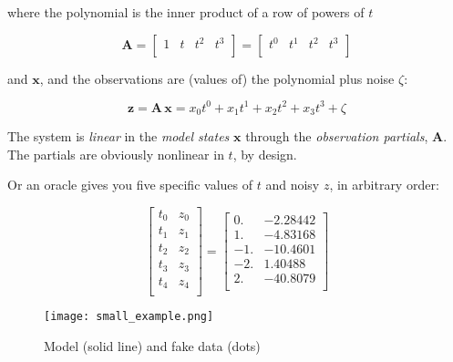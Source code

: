 \documentclass[10pt,oneside,x11names]{article}
\begin{document}
\noindent where the polynomial is the inner product of a row of powers of \(t\)

\begin{equation}
\mathbold{A}=
\begin{bmatrix}
 1 & t & t^2 & t^3 \\
\end{bmatrix}
=
\begin{bmatrix}
 t^0 & t^1 & t^2 & t^3 \\
\end{bmatrix}
\end{equation}

\noindent and \(\mathbold{x}\), and the observations are (values of) the
polynomial plus noise \(\zeta\):

\begin{equation}
\mathbold{z}=\mathbold{A}\,\mathbold{x}=
x_0 t^0 + x_1 t^1 + x_2 t^2 + x_3 t^3 + \zeta
\end{equation}

\noindent The system is \emph{linear} in the \emph{model states}
\(\mathbold{x}\) through the \emph{observation partials}, \(\mathbold{A}\). The
partials are obviously nonlinear in \(t\), by design.

Or an oracle gives you five specific values of \(t\) and noisy \(z\), in
arbitrary order:

\begin{equation}
\begin{bmatrix}
 t_0 & z_0 \\
 t_1 & z_1 \\
 t_2 & z_2 \\
 t_3 & z_3 \\
 t_4 & z_4 \\
\end{bmatrix}
=
\begin{bmatrix}
 0. & -2.28442 \\
 1. & -4.83168 \\
 -1. & -10.4601 \\
 -2. & 1.40488 \\
 2. & -40.8079 \\
\end{bmatrix}
\end{equation}

\begin{figure}[htb]
\centering
\texttt{[image: small\_example.png]}
\caption{\label{fig:orgparagraph1}
Model (solid line) and fake data (dots)}
\end{figure}
\end{document}
